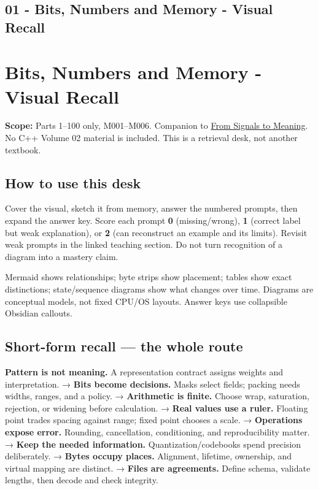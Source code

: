 \hypertarget{appendix-ef4d27797a92}{}
\section*{01 - Bits, Numbers and Memory - Visual Recall}
\chapter{Bits, Numbers and Memory - Visual Recall}\label{appendix-ef4d27797a92-bits-numbers-and-memory---visual-recall}

\textbf{Scope:} Parts 1--100 only, M001--M006. Companion to \href{Continuous\%20Notes/Computing\%20Foundations\%20-\%20From\%20Bits\%20to\%20C++\%20and\%20Systems\%20APIs}{From Signals to Meaning}. No C++ Volume 02 material is included. This is a retrieval desk, not another textbook.

\section{How to use this desk}\label{appendix-ef4d27797a92-how-to-use-this-desk}

Cover the visual, sketch it from memory, answer the numbered prompts, then expand the answer key. Score each prompt \textbf{0} (missing/wrong), \textbf{1} (correct label but weak explanation), or \textbf{2} (can reconstruct an example and its limits). Revisit weak prompts in the linked teaching section. Do not turn recognition of a diagram into a mastery claim.

Mermaid shows relationships; byte strips show placement; tables show exact distinctions; state/sequence diagrams show what changes over time. Diagrams are conceptual models, not fixed CPU/OS layouts. Answer keys use collapsible Obsidian callouts.

\section{Short-form recall --- the whole route}\label{appendix-ef4d27797a92-short-form-recall-the-whole-route}

\textbf{Pattern is not meaning.} A representation contract assigns weights and interpretation. → \textbf{Bits become decisions.} Masks select fields; packing needs widths, ranges, and a policy. → \textbf{Arithmetic is finite.} Choose wrap, saturation, rejection, or widening before calculation. → \textbf{Real values use a ruler.} Floating point trades spacing against range; fixed point chooses a scale. → \textbf{Operations expose error.} Rounding, cancellation, conditioning, and reproducibility matter. → \textbf{Keep the needed information.} Quantization/codebooks spend precision deliberately. → \textbf{Bytes occupy places.} Alignment, lifetime, ownership, and virtual mapping are distinct. → \textbf{Files are agreements.} Define schema, validate lengths, then decode and check integrity.

